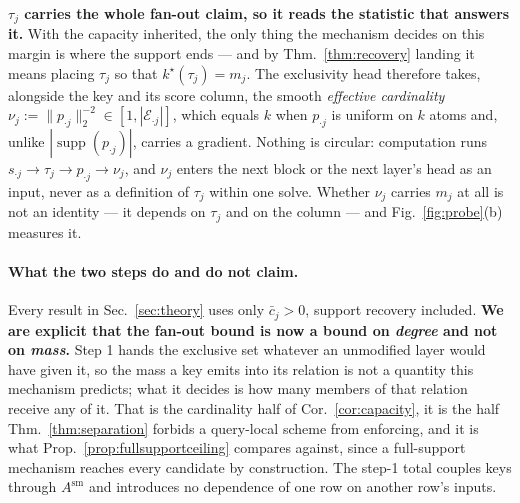 \documentclass{article}
\newcommand{\supp}{\operatorname{supp}}
\begin{document}
\textbf{$\tau_j$ carries the whole fan-out claim, so it reads the statistic that answers it.}
With the capacity inherited, the only thing the mechanism decides on this margin is where the
support ends --- and by Thm.~\ref{thm:recovery} landing it means placing $\tau_j$ so that
$k^\star(\tau_j)=m_j$. The exclusivity head therefore takes, alongside the key and its score
column, the smooth \emph{effective cardinality}
$\nu_j := \|p_{\cdot j}\|_2^{-2} \in [1,|\mathcal{E}_{\cdot j}|]$, which equals $k$ when
$p_{\cdot j}$ is uniform on $k$ atoms and, unlike $|\supp(p_{\cdot j})|$, carries a gradient.
Nothing is circular: computation runs
$s_{\cdot j}\to\tau_j\to p_{\cdot j}\to\nu_j$, and $\nu_j$ enters the next block or the next
layer's head as an input, never as a definition of $\tau_j$ within one solve. Whether $\nu_j$
carries $m_j$ at all is not an identity --- it depends on $\tau_j$ and on the column --- and
Fig.~\ref{fig:probe}(b) measures it.

\paragraph{What the two steps do and do not claim.} Every result in Sec.~\ref{sec:theory} uses
only $\bar c_j>0$, support recovery included. \textbf{We are explicit that the fan-out bound is now a
bound on \emph{degree} and not on \emph{mass}.} Step 1 hands the exclusive set whatever an
unmodified layer would have given it, so the mass a key emits into its relation is not a quantity
this mechanism predicts; what it decides is how many members of that relation receive any of it.
That is the cardinality half of Cor.~\ref{cor:capacity}, it is the half
Thm.~\ref{thm:separation} forbids a query-local scheme from enforcing, and it is what
Prop.~\ref{prop:fullsupportceiling} compares against, since a full-support mechanism reaches
every candidate by construction. The step-1 total couples keys through $A^{\mathrm{sm}}$ and
introduces no dependence of one row on another row's inputs.
\end{document}
